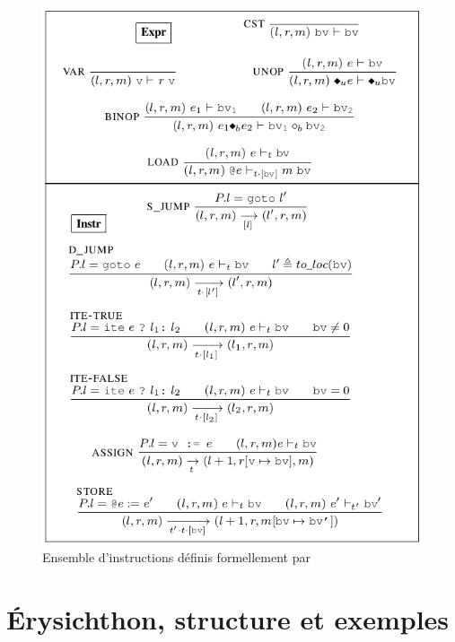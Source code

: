\begin{figure}
  \centering
  \includegraphics[scale = 0.7]{pictures/instructions_formelles.png}
  \caption{Ensemble d'instructions définis formellement par \cite{binsecRel2019}}
  \label{fig:ensemble_instr_formelles}
\end{figure}


\chapter{Érysichthon, structure et exemples}

